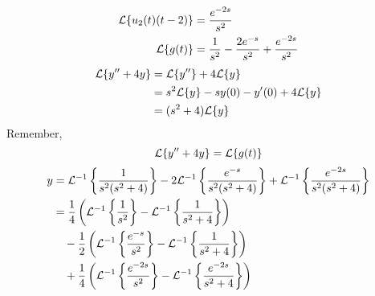 \documentclass[diffeq.tex]{subfiles}
\begin{document}
\begin{example}
\begin{alignat}{1}
            \mathcal{L}\{u_{2}(t)(t - 2)\} &= \frac{e^{-2s}}{s^{2}}\\
            \mathcal{L}\{g(t)\} &= \frac{1}{s^{2}} - \frac{2e^{-s}}{s^{2}} + \frac{e^{-2s}}{s^{2}}\\
        \end{alignat}
        \begin{alignat}{1}
            \mathcal{L}\{y'' + 4y\} &= \mathcal{L}\{y''\} + 4\mathcal{L}\{y\}\\
            &= s^{2}\mathcal{L}\{y\}-sy(0)-y'(0)+4\mathcal{L}\{y\}\\
            &= (s^{2} + 4)\mathcal{L}\{y\}
        \end{alignat}
        Remember,
        \begin{equation}
            \mathcal{L}\{y'' + 4y\} = \mathcal{L}\{g(t)\}
        \end{equation}
        \begin{alignat}{1}
            y &= \mathcal{L}^{-1}\left\{\frac{1}{s^{2}(s^{2} + 4)}\right\} - 2\mathcal{L}^{-1}\left\{\frac{e^{-s}}{s^{2}(s^{2} + 4)}\right\} + \mathcal{L}^{-1}\left\{\frac{e^{-2s}}{s^{2}(s^{2} + 4)}\right\}\\
            &= \frac{1}{4}\left(\mathcal{L}^{-1}\left\{\frac{1}{s^{2}}\right\} - \mathcal{L}^{-1}\left\{\frac{1}{s^{2} + 4}\right\}\right)\\
            &\quad - \frac{1}{2}\left(\mathcal{L}^{-1}\left\{\frac{e^{-s}}{s^{2}}\right\} - \mathcal{L}^{-1}\left\{\frac{1}{s^{2} + 4}\right\}\right)\\
            &\quad + \frac{1}{4}\left(\mathcal{L}^{-1}\left\{\frac{e^{-2s}}{s^{2}}\right\} - \mathcal{L}^{-1}\left\{\frac{e^{-2s}}{s^{2} + 4}\right\}\right)\nonumber
        \end{alignat}
    \end{example}
\end{document}
